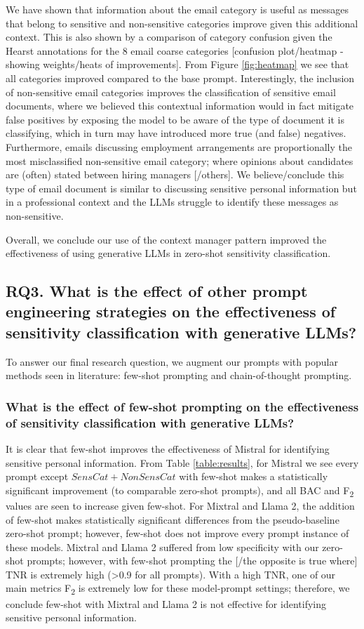 We have shown that information about the email category is useful as messages that belong to sensitive and non-sensitive categories improve given this additional context. This is also shown by a comparison of category confusion given the Hearst annotations for the 8 email coarse categories [confusion plot/heatmap - showing weights/heats of improvements]. From Figure \ref{fig:heatmap} we see that all categories improved compared to the base prompt. Interestingly, the inclusion of non-sensitive email categories improves the classification of sensitive email documents, where we believed this contextual information would in fact mitigate false positives by exposing the model to be aware of the type of document it is classifying, which in turn may have introduced more true (and false) negatives. Furthermore, emails discussing employment arrangements are proportionally the most misclassified non-sensitive email category; where opinions about candidates are (often) stated between hiring managers [/others]. We believe/conclude this type of email document is similar to discussing sensitive personal information but in a professional context and the LLMs struggle to identify these messages as non-sensitive.

Overall, we conclude our use of the context manager pattern improved the effectiveness of using generative LLMs in zero-shot sensitivity classification.

\subsection{RQ3. What is the effect of other prompt engineering strategies on the effectiveness of sensitivity classification with generative LLMs?}

To answer our final research question, we augment our prompts with popular methods seen in literature: few-shot prompting and chain-of-thought prompting.

\subsubsection{What is the effect of few-shot prompting on the effectiveness of sensitivity classification with generative LLMs?}

It is clear that few-shot improves the effectiveness of Mistral for identifying sensitive personal information. From Table \ref{table:results}, for Mistral we see every prompt except $SensCat+NonSensCat$ with few-shot makes a statistically significant improvement (to comparable zero-shot prompts), and all BAC and F\textsubscript{2} values are seen to increase given few-shot. For Mixtral and Llama 2, the addition of few-shot makes statistically significant differences from the pseudo-baseline zero-shot prompt; however, few-shot does not improve every prompt instance of these models. Mixtral and Llama 2 suffered from low specificity with our zero-shot prompts; however, with few-shot prompting the [/the opposite is true where] TNR is extremely high (>0.9 for all prompts). With a high TNR, one of our main metrics F\textsubscript{2} is extremely low for these model-prompt settings; therefore, we conclude few-shot with Mixtral and Llama 2 is not effective for identifying sensitive personal information.

